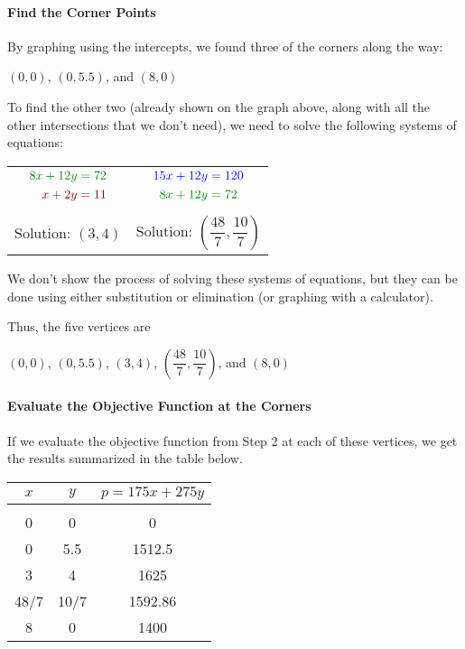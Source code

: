 \paragraph{Find the Corner Points} By graphing using the intercepts, we found three of the corners along the way:
\begin{center}
$(0,0)$, $(0,5.5)$, and $(8,0)$
\end{center}
To find the other two (already shown on the graph above, along with all the other intersections that we don't need), we need to solve the following systems of equations:
\begin{center}
\begin{tabular}{c c}
{$\begin{aligned}
\color{green!50!black}8x+12y &\color{green!50!black}= 72\\
\color{red!50!black}x+2y &\color{red!50!black}= 11
\end{aligned}$} \hspace*{0.75in}
& 
{$\begin{aligned}
\color{blue}15x+12y &\color{blue}= 120\\
\color{green!50!black}8x+12y &\color{green!50!black}= 72
\end{aligned}$}\\
& \\
Solution: $(3,4)$ \hspace*{0.75in} & Solution: $\left(\dfrac{48}{7},\dfrac{10}{7}\right)$
\end{tabular}
\end{center}

We don't show the process of solving these systems of equations, but they can be done using either substitution or elimination (or graphing with a calculator).

Thus, the five vertices are
\begin{center} 
$(0,0)$, $(0,5.5)$, $(3,4)$, $\left(\dfrac{48}{7},\dfrac{10}{7}\right)$, and $(8,0)$
\end{center}

\paragraph{Evaluate the Objective Function at the Corners} If we evaluate the objective function from Step 2 at each of these vertices, we get the results summarized in the table below.
\begin{center}
\begin{tabular}{|c c | c|}
\hline
$x$ & $y$ & $p=175x+275y$\\
\hline
& & \\
0 & 0 & 0\\
0 & 5.5 & 1512.5\\
\rowcolor{green!30!white}3 & 4 & 1625\\
48/7 & 10/7 & 1592.86\\
8 & 0 & 1400\\
\hline
\end{tabular}
\end{center}

